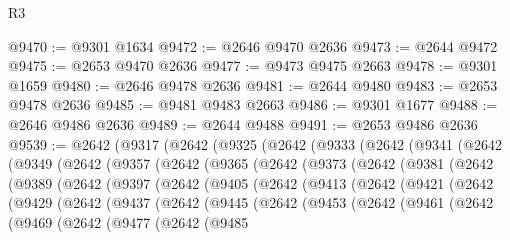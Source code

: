 \begin{lexlean}{R3}
\begin{coremodule}
@9470 := @9301 @1634
@9472 := @2646 @9470 @2636
@9473 := @2644 @9472
@9475 := @2653 @9470 @2636
@9477 := @9473 @9475 @2663
@9478 := @9301 @1659
@9480 := @2646 @9478 @2636
@9481 := @2644 @9480
@9483 := @2653 @9478 @2636
@9485 := @9481 @9483 @2663
@9486 := @9301 @1677
@9488 := @2646 @9486 @2636
@9489 := @2644 @9488
@9491 := @2653 @9486 @2636
@9539 := @2642
    (@9317
      (@2642
        (@9325
          (@2642
            (@9333
              (@2642
                (@9341
                  (@2642
                    (@9349
                      (@2642
                        (@9357
                          (@2642
                            (@9365
                              (@2642
                                (@9373
                                  (@2642
                                    (@9381
                                      (@2642
                                        (@9389
                                          (@2642
                                            (@9397
                                              (@2642
                                                (@9405
                                                  (@2642
                                                    (@9413
                                                      (@2642
                                                        (@9421
                                                          (@2642
                                                            (@9429
                                                              (@2642
                                                                (@9437
                                                                  (@2642
                                                                    (@9445
                                                                      (@2642
                                                                        (@9453
                                                                          (@2642
                                                                            (@9461
                                                                              (@2642
                                                                                (@9469
                                                                                  (@2642
                                                                                    (@9477
                                                                                      (@2642
                                                                                        (@9485

\end{coremodule}
\end{lexlean}
